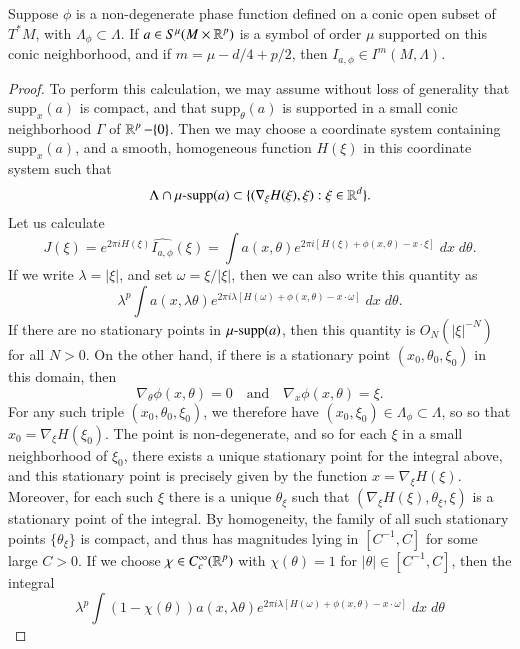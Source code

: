 \begin{lemma}
    Suppose $\phi$ is a non-degenerate phase function defined on a conic open subset of $T^* M$, with $\Lambda_\phi \subset \Lambda$. If $a \in S^\mu(M \times \operatorname{\mathbb{R}}^p)$ is a symbol of order $\mu$ supported on this conic neighborhood, and if $m = \mu - d/4 + p/2$, then $I_{a,\phi} \in I^m(M,\Lambda)$.
\end{lemma}
\begin{proof}
    To perform this calculation, we may assume without loss of generality that $\text{supp}_x(a)$ is compact, and that $\text{supp}_\theta(a)$ is supported in a small conic neighborhood $\Gamma$ of $\operatorname{\mathbb{R}}^p - \{ 0 \}$. Then we may choose a coordinate system containing $\text{supp}_x(a)$, and a smooth, homogeneous function $H(\xi)$ in this coordinate system such that
    \[ \Lambda \cap \operatorname{\text{$\mu$-supp}}(a) \subset \{ (\nabla_\xi H(\xi), \xi) : \xi \in \operatorname{\mathbb{R}}^d \}. \]
    Let us calculate
    \[ J(\xi) = e^{2 \pi i H(\xi)} \widehat{I_{a,\phi}}(\xi) = \int a(x,\theta) e^{2 \pi i [ H(\xi) + \phi(x,\theta) - x \cdot \xi ]}\; dx\; d\theta. \]
    If we write $\lambda = |\xi|$, and set $\omega = \xi / |\xi|$, then we can also write this quantity as
    \[ \lambda^p \int a(x, \lambda \theta) e^{2 \pi i \lambda [ H(\omega) + \phi(x,\theta) - x \cdot \omega ]}\; dx\; d\theta. \]
    If there are no stationary points in $\operatorname{\text{$\mu$-supp}}(a)$, then this quantity is $O_N(|\xi|^{-N})$ for all $N > 0$. On the other hand, if there is a stationary point $(x_0,\theta_0,\xi_0)$ in this domain, then
    \[ \nabla_\theta \phi(x,\theta) = 0 \quad\text{and}\quad \nabla_x \phi(x,\theta) = \xi. \]
    For any such triple $(x_0,\theta_0,\xi_0)$, we therefore have $(x_0,\xi_0) \in \Lambda_\phi \subset \Lambda$, so so that $x_0 = \nabla_\xi H(\xi_0)$. The point is non-degenerate, and so for each $\xi$ in a small neighborhood of $\xi_0$, there exists a unique stationary point for the integral above, and this stationary point is precisely given by the function $x = \nabla_\xi H(\xi)$. Moreover, for each such $\xi$ there is a unique $\theta_\xi$ such that $(\nabla_\xi H(\xi), \theta_\xi, \xi)$ is a stationary point of the integral. By homogeneity, the family of all such stationary points $\{ \theta_\xi \}$ is compact, and thus has magnitudes lying in $[C^{-1}, C]$ for some large $C > 0$. If we choose $\chi \in C_c^\infty(\operatorname{\mathbb{R}}^p)$ with $\chi(\theta) = 1$ for $|\theta| \in [C^{-1}, C]$, then the integral
    \[ \lambda^p \int (1 - \chi(\theta)) a(x, \lambda \theta) e^{2 \pi i \lambda [ H(\omega) + \phi(x,\theta) - x \cdot \omega ]}\; dx\; d\theta \]

\end{proof}
